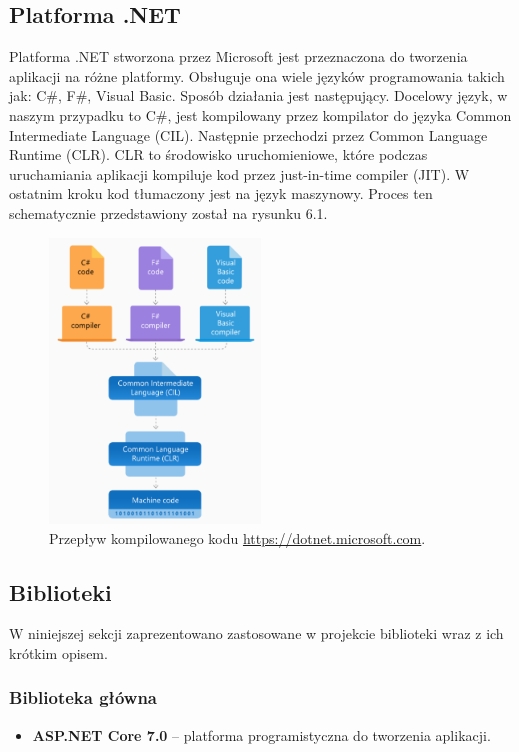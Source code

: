 \documentclass[a4paper,twoside,12pt]{book}
\begin{document}
\subsection{Platforma .NET}
Platforma .NET stworzona przez Microsoft jest przeznaczona do tworzenia aplikacji na różne platformy. Obsługuje ona wiele języków programowania takich jak: C\#, F\#, Visual Basic. Sposób działania jest następujący. Docelowy język, w naszym przypadku to C\#, jest kompilowany przez kompilator do języka Common Intermediate Language (CIL). Następnie przechodzi przez Common Language Runtime (CLR). CLR to środowisko uruchomieniowe, które podczas uruchamiania aplikacji kompiluje kod przez just-in-time compiler (JIT). W ostatnim kroku kod tłumaczony jest na język maszynowy. Proces ten schematycznie przedstawiony został na rysunku 6.1.

\begin{figure}[h]
    \centering
    \includegraphics[width=0.5\textwidth]{compiler.png}
    \caption{Przepływ kompilowanego kodu \href{https://dotnet.microsoft.com/en-us/learn/dotnet/what-is-dotnet-framework}{https://dotnet.microsoft.com}.}
    \label{Kompilator}
\end{figure}

\subsection{Biblioteki}
W niniejszej sekcji zaprezentowano zastosowane w projekcie biblioteki wraz z ich krótkim opisem.
\subsubsection{Biblioteka główna}
    \begin{itemize}
        \item \textbf{ASP.NET Core 7.0} -- platforma programistyczna do tworzenia aplikacji.
    \end{itemize}
\end{document}
